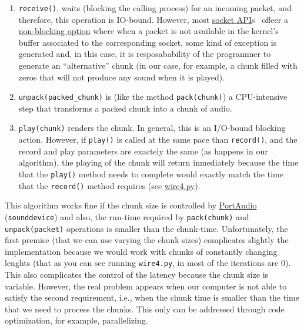 \begin{enumerate}
\item \verb|receive()|, waits (blocking the calling process) for an
  incoming packet, and therefore, this operation is IO-bound. However,
  most \href{https://docs.python.org/3/library/socket.html}{socket
    API}s~\cite{python} offeer a
  \href{https://docs.python.org/3.8/library/socket.html#socket.socket.setblocking}{non-blocking
    option} where when a packet is not available in the kernel's
  buffer associated to the corresponding socket, some kind of
  exception is generated and, in this case, it is resposabability of
  the programmer to generate an ``alternative'' chunk (in our case,
  for example, a chunk filled with zeros that will not produce any
  sound when it is played).

\item \verb|unpack(packed_chunk)| is (like the method
  \texttt{pack(chunk)}) a CPU-intensive step that transforms a
  packed chunk into a chunk of audio.

\item \verb|play(chunk)| renders the chunk. In general, this is an
  I/O-bound blocking action. However, if \verb|play()| is called at
  the same pace than \verb|record()|, and the record and play
  parameters are exactely the same (as happens in our algorithm), the
  playing of the chunk will return inmediately because the time that
  the \verb|play()| method needs to complete would exactly match the
  time that the \verb|record()| method requires (see
  \href{https://github.com/Tecnologias-multimedia/InterCom/blob/master/test/sounddevice/wire4.py}{wire4.py}).
\end{enumerate}

This algorithm works fine if the chunk size is controlled by
\href{http://www.portaudio.com/}{PortAudio}~\cite{portaudio}
(\verb|sounddevice|) and also, the run-time required by
\verb|pack(chunk)| and \verb|unpack(packet)| operations is smaller
than the chunk-time. Unfortunately, the first premise (that we can use
varying the chunk sizes) complicates slightly the implementation
because we would work with chunks of constantly changing lenghts (that
as you can see running \verb|wire4.py|, in most of the iterations are
0). This also complicates the control of the latency because the chunk
size is variable. However, the real problem appears when our computer
is not able to satisfy the second requirement, i.e., when the chunk
time is smaller than the time that we need to process the chunks. This
only can be addressed through code optimization, for example,
parallelizing.


